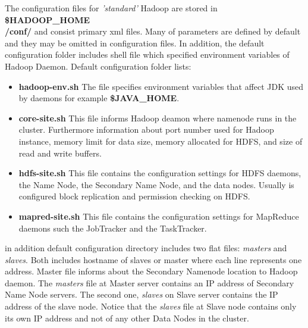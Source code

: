 \documentclass[a4paper,12pt,oneside]{report}
\begin{document}
The configuration files for \textit{'standard'} Hadoop are stored in \textbf{\$HADOOP\_HOME\\/conf/} 
and consist  primary xml files. Many of parameters are defined by default and they may be omitted in configuration files. In addition, the default 
configuration folder  includes shell file which specified environment variables of Hadoop Daemon. Default configuration folder lists:
\begin{itemize}
\item \textbf{hadoop-env.sh} The file specifies environment variables that affect JDK used by daemons
for example \textbf{\$JAVA\_HOME}.
\item \textbf{core-site.sh}   This file informs Hadoop deamon where namenode runs in the cluster. Furthermore 
information about port number used for Hadoop instance, memory limit for data size,  memory allocated for HDFS, and size of read and write buffers.
\item \textbf{hdfs-site.sh}  This file contains the configuration settings for HDFS daemons, the Name 
Node, the Secondary Name Node, and the data nodes. Usually is configured block replication and permission checking on HDFS. 
\item \textbf{mapred-site.sh}  This file contains the configuration settings for MapReduce daemons 
such the JobTracker and the TaskTracker.
\end{itemize}

in addition default configuration directory includes two flat files: \textit{masters} and \textit{slaves}. 
Both includes hostname of slaves or master where each line represents one address. 
Master file informs about the Secondary Namenode location to Hadoop daemon. The \textit{masters} 
file at Master server contains an IP address of Secondary Name Node servers.
The second one, \textit{slaves} on Slave server contains the IP address of the slave node. Notice 
that the \textit{slaves} file at Slave node contains only its own IP address and not of any other Data Nodes in the cluster.
\end{document}
